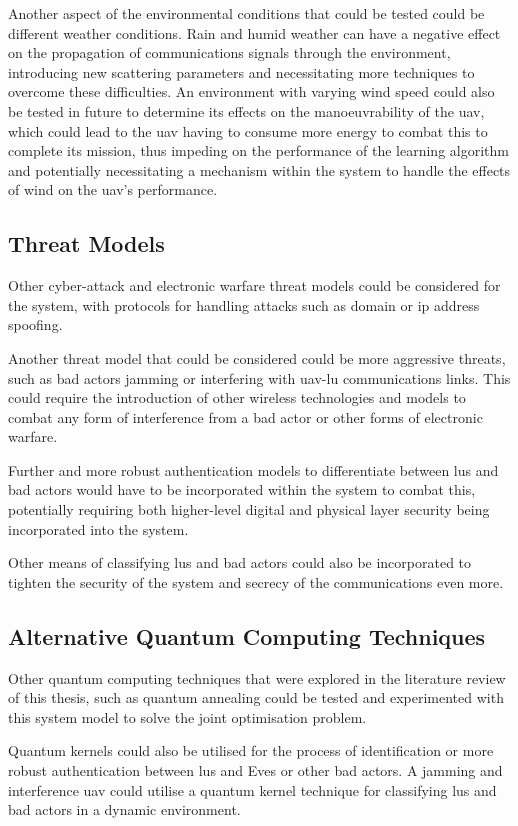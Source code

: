 Another aspect of the environmental conditions that could be tested could be different weather conditions. 
Rain and humid weather can have a negative effect on the propagation of communications signals through the environment, introducing new scattering parameters and necessitating more techniques to overcome these difficulties. 
An environment with varying wind speed could also be tested in future to determine its effects on the manoeuvrability of the \acrshort{uav}, which could lead to the \acrshort{uav} having to consume more energy to combat this to complete its mission, thus impeding on the performance of the learning algorithm and potentially necessitating a mechanism within the system to handle the effects of wind on the \acrshort{uav}'s performance. 
\subsection{Threat Models}
Other cyber-attack and electronic warfare threat models could be considered for the system, with protocols for handling attacks such as domain or \acrfull{ip} address spoofing.

Another threat model that could be considered could be more aggressive threats, such as bad actors jamming or interfering with \acrshort{uav}-\acrshort{lu} communications links. 
This could require the introduction of other wireless technologies and models to combat any form of interference from a bad actor or other forms of electronic warfare. 

Further and more robust authentication models to differentiate between \acrshort{lu}s and bad actors would have to be incorporated within the system to combat this, potentially requiring both higher-level digital and physical layer security being incorporated into the system. 

Other means of classifying \acrshort{lu}s and bad actors could also be incorporated to tighten the security of the system and secrecy of the communications even more. 
\subsection{Alternative Quantum Computing Techniques}
Other quantum computing techniques that were explored in the literature review of this thesis, such as quantum annealing could be tested and experimented with this system model to solve the joint optimisation problem. 

Quantum kernels could also be utilised for the process of identification or more robust authentication between \acrshort{lu}s and Eves or other bad actors. 
A jamming and interference \acrshort{uav} could utilise a quantum kernel technique for classifying \acrshort{lu}s and bad actors in a dynamic environment. 


